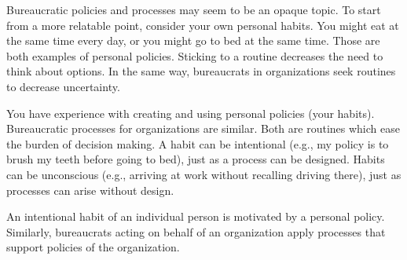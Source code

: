 
Bureaucratic policies and processes may seem to be an opaque topic. To start from a more relatable point, consider your own personal habits.
You might eat at the same time every day, or you might go to bed at the same time. Those are both examples of personal policies. Sticking to a routine decreases the need to think about options. In the same way, bureaucrats in organizations seek routines to decrease uncertainty. 

You have experience with creating and using personal policies (your habits).  Bureaucratic processes for organizations are similar.
Both are routines which ease the burden of decision making. A habit can be intentional (e.g., my policy is to brush my teeth before going to bed), just as a process can be designed. Habits can be unconscious (e.g., arriving at work without recalling driving there), just as processes can arise without design. 

An intentional habit of an individual person is motivated by a personal policy. Similarly, bureaucrats acting on behalf of an organization apply processes that support policies of the organization.

